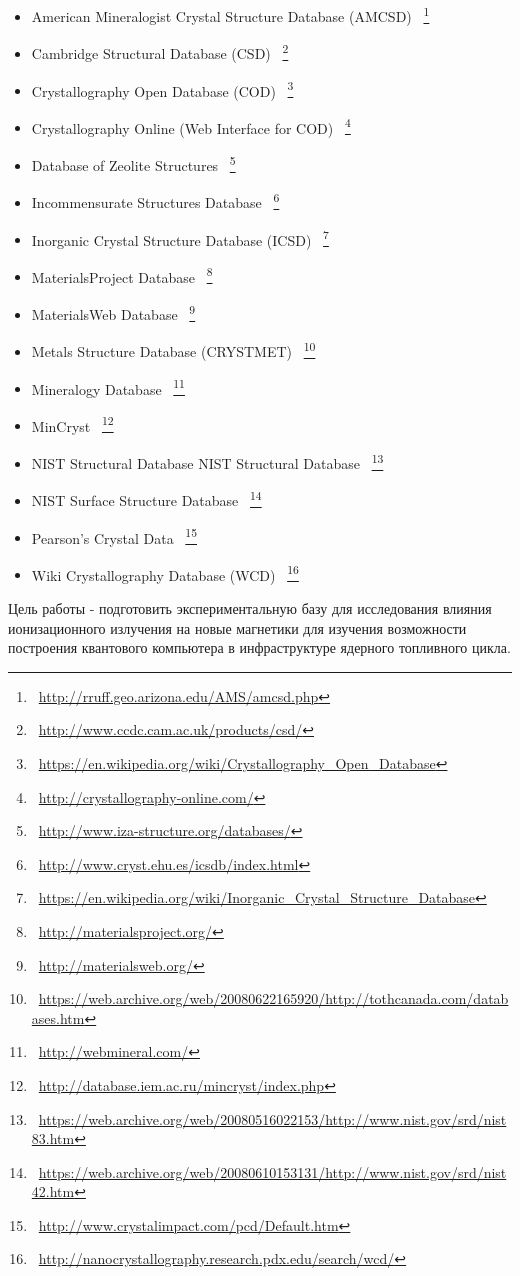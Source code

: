 \documentclass[11pt]{article}
\begin{document}
\begin{itemize} 
\item American Mineralogist Crystal Structure Database (AMCSD)  ~\footnote{~\url{http://rruff.geo.arizona.edu/AMS/amcsd.php}} 
\item Cambridge Structural Database (CSD) ~\footnote{~\url{http://www.ccdc.cam.ac.uk/products/csd/}}
\item Crystallography Open Database (COD) ~\footnote{~\url{https://en.wikipedia.org/wiki/Crystallography_Open_Database}}
\item Crystallography Online (Web Interface for COD) ~\footnote{~\url{http://crystallography-online.com/}}
\item Database of Zeolite Structures ~\footnote{~\url{http://www.iza-structure.org/databases/}}
\item Incommensurate Structures Database ~\footnote{~\url{http://www.cryst.ehu.es/icsdb/index.html}}
\item Inorganic Crystal Structure Database (ICSD) ~\footnote{~\url{https://en.wikipedia.org/wiki/Inorganic_Crystal_Structure_Database}}
\item MaterialsProject Database ~\footnote{~\url{http://materialsproject.org/}}
\item MaterialsWeb Database ~\footnote{~\url{http://materialsweb.org/}}
\item Metals Structure Database (CRYSTMET) ~\footnote{~\url{https://web.archive.org/web/20080622165920/http://tothcanada.com/databases.htm}}
\item Mineralogy Database ~\footnote{~\url{http://webmineral.com/}}
\item MinCryst ~\footnote{~\url{http://database.iem.ac.ru/mincryst/index.php}}
\item NIST Structural Database NIST Structural Database  ~\footnote{~\url{https://web.archive.org/web/20080516022153/http://www.nist.gov/srd/nist83.htm}}
\item NIST Surface Structure Database ~\footnote{~\url{https://web.archive.org/web/20080610153131/http://www.nist.gov/srd/nist42.htm}}
\item Pearson's Crystal Data ~\footnote{~\url{http://www.crystalimpact.com/pcd/Default.htm}}
\item Wiki Crystallography Database (WCD)  ~\footnote{~\url{http://nanocrystallography.research.pdx.edu/search/wcd/}}
\end{itemize} 

Цель работы - подготовить экспериментальную базу для исследования влияния ионизационного излучения на новые магнетики для изучения возможности построения квантового компьютера в инфраструктуре ядерного топливного цикла. 
\end{document}
